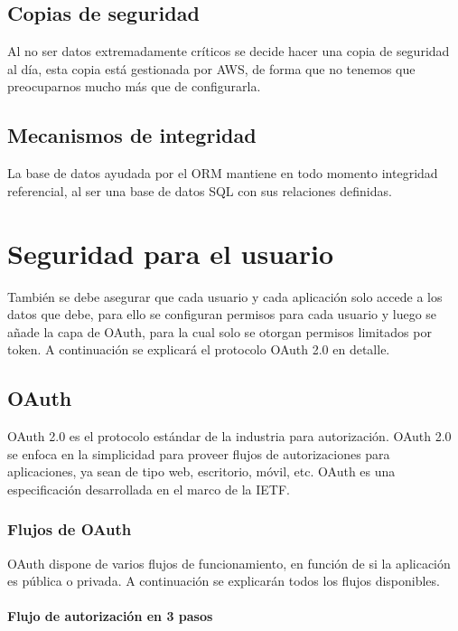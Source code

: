 \documentclass[12pt,a4paperpaper,]{report}
\let\oldparagraph\paragraph
\renewcommand{\paragraph}[1]{\oldparagraph{#1}\mbox{}}
\begin{document}
\subsection{Copias de seguridad}\label{copias-de-seguridad}

Al no ser datos extremadamente críticos se decide hacer una copia de
seguridad al día, esta copia está gestionada por AWS, de forma que no
tenemos que preocuparnos mucho más que de configurarla.

\subsection{Mecanismos de integridad}\label{mecanismos-de-integridad}

La base de datos ayudada por el ORM mantiene en todo momento integridad
referencial, al ser una base de datos SQL con sus relaciones definidas.

\section{Seguridad para el usuario}\label{seguridad-para-el-usuario}

También se debe asegurar que cada usuario y cada aplicación solo accede
a los datos que debe, para ello se configuran permisos para cada usuario
y luego se añade la capa de OAuth, para la cual solo se otorgan permisos
limitados por token. A continuación se explicará el protocolo OAuth 2.0
en detalle.

\subsection{OAuth}\label{oauth}

OAuth 2.0 es el protocolo estándar de la industria para autorización.
OAuth 2.0 se enfoca en la simplicidad para proveer flujos de
autorizaciones para aplicaciones, ya sean de tipo web, escritorio,
móvil, etc. OAuth es una especificación desarrollada en el marco de la
IETF.

\subsubsection{Flujos de OAuth}\label{flujos-de-oauth}

OAuth dispone de varios flujos de funcionamiento, en función de si la
aplicación es pública o privada. A continuación se explicarán todos los
flujos disponibles.

\paragraph{Flujo de autorización en 3
pasos}\label{flujo-de-autorizaciuxf3n-en-3-pasos}
\end{document}
